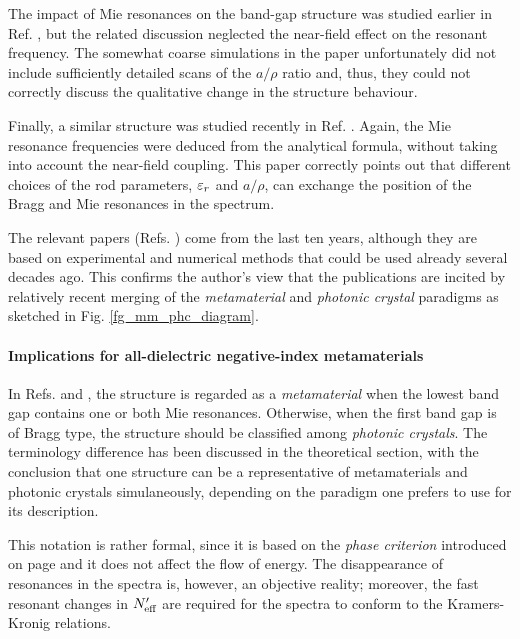 The impact of Mie resonances on the band-gap structure was studied earlier in Ref. \cite{shi2007}, but the related discussion neglected the near-field effect on the resonant frequency. The somewhat coarse simulations in the paper unfortunately did not include sufficiently detailed scans of the $a/\rho$ ratio and, thus, they could not correctly discuss the qualitative change in the structure behaviour. 

Finally, a similar structure was studied recently in Ref. \cite{rybin2014photonic}. Again, the Mie resonance frequencies were deduced from the analytical formula, without taking into account the near-field coupling. This paper correctly points out that different choices of the rod parameters, $\varepsilon_r$ and $a/\rho$, can exchange the position of the Bragg and Mie resonances in the spectrum.

The relevant papers (Refs. \cite{shi2007, peng2007, vynck2009all, rybin2014photonic, dominec2014transition}) come from the last ten years, although they are based on experimental and numerical methods that could be used already several decades ago. This confirms the author's view that the publications are incited by relatively recent merging of the \textit{metamaterial} and \textit{photonic crystal} paradigms as sketched in Fig. \ref{fg_mm_phc_diagram}.

\paragraph{Implications for all-dielectric negative-index metamaterials} %
In Refs.  \cite{rybin2014photonic} and \cite{dominec2014transition}, the structure is regarded as a \textit{metamaterial} when the lowest band gap contains one or both Mie resonances. Otherwise, when the first band gap is of Bragg type, the structure should be classified among \textit{photonic crystals}. 
The terminology difference has been discussed in the theoretical section, with the conclusion that one structure can be a representative of metamaterials and photonic crystals simulaneously, depending on the paradigm one prefers to use for its description. 

This notation is rather formal, since it is based on the \textit{phase criterion} introduced on page \pageref{phasecriterion} and it does not affect the flow of energy. 
The disappearance of resonances in the spectra is, however, an objective reality;  moreover, the fast resonant changes in $N_{\text{eff} }'$ are required for the spectra to conform to the Kramers-Kronig relations. 

